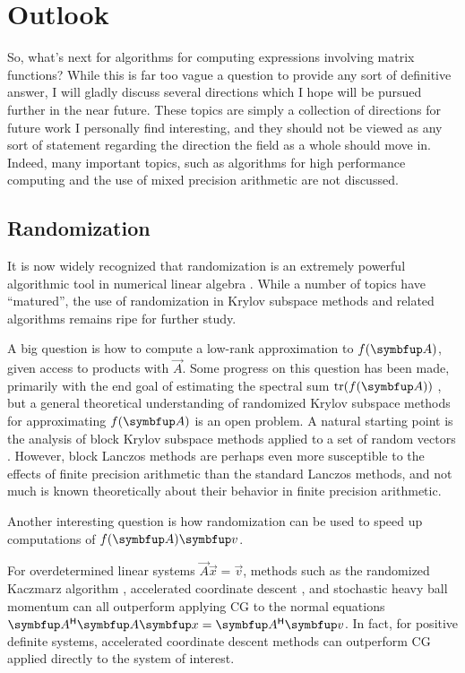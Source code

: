 \chapter{Outlook}


So, what's next for algorithms for computing expressions involving matrix functions?
While this is far too vague a question to provide any sort of definitive answer, I will gladly discuss several directions which I hope will be pursued further in the near future.
These topics are simply a collection of directions for future work I personally find interesting, and they should not be viewed as any sort of statement regarding the direction the field as a whole should move in.
Indeed, many important topics, such as algorithms for high performance computing and the use of mixed precision arithmetic \cite{mixed_21} are not discussed.


\section{Randomization}

It is now widely recognized that randomization is an extremely powerful algorithmic tool in numerical linear algebra \cite{halko_martinsson_tropp_11,martinsson_tropp_20}.
While a number of topics have ``matured'', the use of randomization in Krylov subspace methods and related algorithms remains ripe for further study.

A big question is how to compute a low-rank approximation to \( \fA \), given access to products with \( \vec{A} \).
Some progress on this question has been made, primarily with the end goal of estimating the spectral sum \( \tr(\fA) \) \cite{lin_17,gambhir_stathopoulos_orginos_17,saibaba_alexanderian_ipsen_17,li_zhu_21,chen_hallman_22}, but a general theoretical understanding of randomized Krylov subspace methods for approximating \( \fA \) is an open problem.
A natural starting point is the analysis of block Krylov subspace methods applied to a set of random vectors \cite{musco_musco_15,martinsson_tropp_20,tropp_21}.
However, block Lanczos methods are perhaps even more susceptible to the effects of finite precision arithmetic than the standard Lanczos methods, and not much is known theoretically about their behavior in finite precision arithmetic.


Another interesting question is how randomization can be used to speed up computations of \( \fA\vec{v} \).

For overdetermined linear systems \( \vec{A} \vec{x} = \vec{v} \), methods such as the randomized Kaczmarz algorithm \cite{strohmer_vershynin_08,needell_srebro_ward_14}, accelerated coordinate descent \cite{lee_sidford_13,allenzhu_qu_richtarik_yuan_16}, and stochastic heavy ball momentum \cite{bollapragada_chen_ward_22} can all outperform applying CG to the normal equations \( \vec{A}^\cT \vec{A} \vec{x} = \vec{A}^\cT \vec{v} \).
In fact, for positive definite systems, accelerated coordinate descent methods can outperform CG applied directly to the system of interest.

